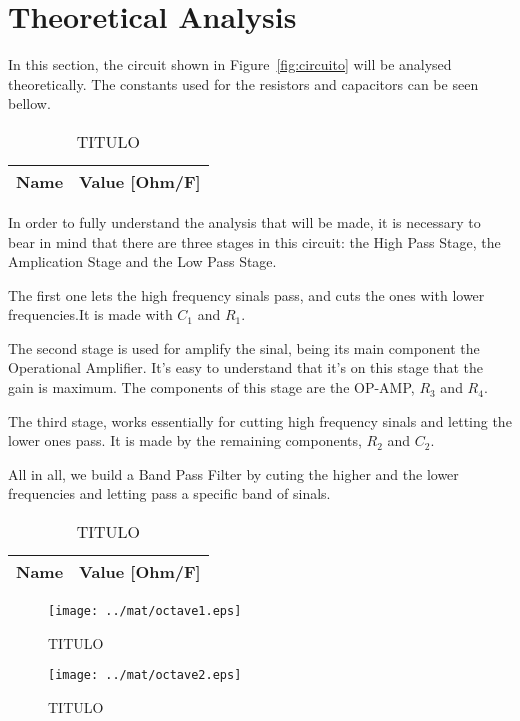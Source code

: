\section{Theoretical Analysis}
\label{sec:analysis}

\hspace{0,5cm} In this section, the  circuit shown in Figure~\ref{fig:circuito} will be analysed theoretically.
The constants used for the resistors and capacitors can be seen bellow.


\begin{table}[H]
  \centering
  \begin{tabular}{|l|r|}
    \hline    
    {\bf Name} & {\bf Value [Ohm/F]} \\ \hline
    
  \end{tabular}
  \caption{TITULO}
  \label{tab:mat1}
\end{table}


\par In order to fully understand the analysis that will be made, it is necessary to bear in mind that there are three stages in this circuit: the High Pass Stage, the Amplication Stage and the Low Pass Stage. 
\par The first one lets the high frequency sinals pass, and cuts the ones with lower frequencies.It is made with $C_1$ and $R_1$. 
\par The second stage is used for amplify the sinal, being its main component the Operational Amplifier. It's easy to understand that it's on this stage that the gain is maximum. The components of this stage are the OP-AMP, $R_3$ and $R_4$. 
\par The third stage, works essentially for cutting high frequency sinals and letting the lower ones pass. It is made by the remaining components, $R_2$ and $C_2$. 
\par All in all, we build a Band Pass Filter by cuting the higher and the lower frequencies and letting pass a specific band of sinals.

\begin{table}[H]
  \centering
  \begin{tabular}{|l|r|}
    \hline    
    {\bf Name} & {\bf Value [Ohm/F]} \\ \hline
    
  \end{tabular}
  \caption{TITULO}
  \label{tab:mat2}
\end{table}

\begin{figure}[H] \centering
\texttt{[image: ../mat/octave1.eps]}
\caption{TITULO}
\label{fig:mat3}
\end{figure}

\begin{figure}[H] \centering
\texttt{[image: ../mat/octave2.eps]}
\caption{TITULO}
\label{fig:mat4}
\end{figure}







